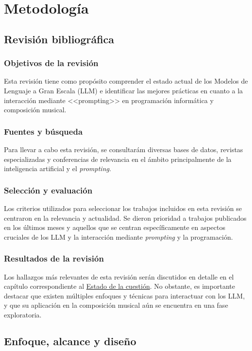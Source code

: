 \chapter{Metodología}

\section{Revisión bibliográfica}

\subsection{Objetivos de la revisión}
Esta revisión tiene como propósito comprender el estado actual de los Modelos de Lenguaje a Gran Escala (LLM) e identificar las mejores prácticas en cuanto a la interacción mediante <<prompting>> en programación informática y composición musical.

\subsection{Fuentes y búsqueda}
Para llevar a cabo esta revisión, se consultarám diversas bases de datos, revistas especializadas y conferencias de relevancia en el ámbito principalmente de la inteligencia artificial y el \textit{prompting}.

\subsection{Selección y evaluación}
Los criterios utilizados para seleccionar los trabajos incluidos en esta revisión se centraron en la relevancia y actualidad. Se dieron prioridad a trabajos publicados en los últimos meses y aquellos que se centran específicamente en aspectos cruciales de los LLM y la interacción mediante \textit{prompting} y la programación.

\subsection{Resultados de la revisión}
Los hallazgos más relevantes de esta revisión serán discutidos en detalle en el capítulo correspondiente al \hyperref[chap:estado_cuestion]{Estado de la cuestión}. No obstante, es importante destacar que existen múltiples enfoques y técnicas para interactuar con los LLM, y que su aplicación en la composición musical aún se encuentra en una fase exploratoria.

\section{Enfoque, alcance y diseño}

